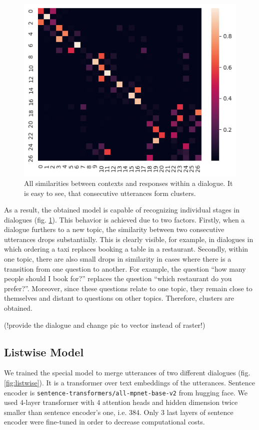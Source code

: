 \documentclass{article}
\begin{document}
\begin{figure}[!htb]
    \centering
    \includegraphics[width=0.5\linewidth]{figures/pairwise-cluster-heatmap.jpg}
    \caption{All similarities between contexts and responses within a dialogue. It is easy to see, that consecutive utterances form clusters.}
    \label{fig:pairwise-clister-heatmap}
\end{figure}

As a result, the obtained model is capable of recognizing individual stages in dialogues (fig. \ref{fig:pairwise-clister-heatmap}). This behavior is achieved due to two factors. Firstly, when a dialogue furthers to a new topic, the similarity between two consecutive utterances drops substantially. This is clearly visible, for example, in dialogues in which ordering a taxi replaces booking a table in a restaurant. Secondly, within one topic, there are also small drops in similarity in cases where there is a transition from one question to another. For example, the question “how many people should I book for?” replaces the question “which restaurant do you prefer?”. Moreover, since these questions relate to one topic, they remain close to themselves and distant to questions on other topics. Therefore, clusters are obtained.

(!provide the dialogue and change pic to vector instead of raster!)

\subsection{Listwise Model}

We trained the special model to merge utterances of two different dialogues (fig. \ref{fig:listwise}). It is a transformer over text embeddings of the utterances. Sentence encoder is \texttt{sentence-transformers/all-mpnet-base-v2} from hugging face. We used 4-layer transformer with 4 attention heads and hidden dimension twice smaller than sentence encoder's one, i.e. 384. Only 3 last layers of sentence encoder were fine-tuned in order to decrease computational costs.
\end{document}
